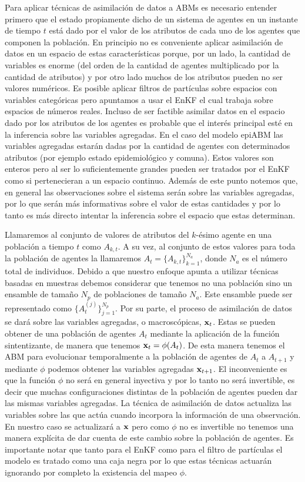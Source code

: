 Para aplicar técnicas de asimilación de datos a ABMs es necesario entender primero que el estado propiamente dicho de un sistema de agentes en un instante de tiempo $t$ está dado por el valor de los atributos de cada uno de los agentes que componen la población. En principio no es conveniente aplicar asimilación de datos en un espacio de estas características porque, por un lado, la cantidad de variables es enorme (del orden de la cantidad de agentes multiplicado por la cantidad de atributos) y por otro lado muchos de los atributos pueden no ser valores numéricos. Es posible aplicar filtros de partículas sobre espacios con variables categóricas pero apuntamos a usar el EnKF el cual trabaja sobre espacios de números reales. Incluso de ser factible asimilar datos en el espacio dado por los atributos de los agentes es probable que el interés principal esté en la inferencia sobre las variables agregadas. En el caso del modelo epiABM las variables agregadas estarán dadas por la cantidad de agentes con determinados atributos (por ejemplo estado epidemiológico y comuna). Estos valores son enteros pero al ser lo suficientemente grandes pueden ser tratados por el EnKF como si pertenecieran a un espacio continuo. Además de este punto notemos que, en general las observaciones sobre el sistema serán sobre las variables agregadas, por lo que serán más informativas sobre el valor de estas cantidades y por lo tanto es más directo intentar la inferencia sobre el espacio que estas determinan.

Llamaremos al conjunto de valores de atributos del $k$-ésimo agente en una población a tiempo $t$ como $A_{k, t}$. A su vez, al conjunto de estos valores para toda la población de agentes la llamaremos $A_t = \{ A_{k, t} \}_{k=1}^{N_a}$, donde $N_a$ es el número total de individuos. Debido a que nuestro enfoque apunta a utilizar técnicas basadas en muestras debemos considerar que tenemos no una población sino un ensamble de tamaño $N_p$ de poblaciones de tamaño $N_a$. Este ensamble puede ser representado como $\{ A_{t}^{(j)} \}_{j=1}^{N_p}$. Por su parte, el proceso de asimilación de datos se dará sobre las variables agregadas, o macroscópicas, $\mathbf{x}_t$. Estas se pueden obtener de una población de agentes $A_t$ mediante la aplicación de la función sintentizante, de manera que tenemos $\mathbf{x}_t = \phi (A_t)$. De esta manera tenemos el ABM para evolucionar temporalmente a la población de agentes de $A_t$ a $A_{t+1}$ y mediante $\phi$ podemos obtener las variables agregadas $\mathbf{x}_{t+1}$. El inconveniente es que la función $\phi$ no será en general inyectiva y por lo tanto no será invertible, es decir que muchas configuraciones distintas de la población de agentes pueden dar las mismas variables agregadas. La técnica de asimilación de datos actualiza las variables sobre las que actúa cuando incorpora la información de una observación. En nuestro caso se actualizará a $\mathbf{x}$ pero como $\phi$ no es invertible no tenemos una manera explícita de dar cuenta de este cambio sobre la población de agentes. Es importante notar que tanto para el EnKF como para el filtro de partículas el modelo es tratado como una caja negra por lo que estas técnicas actuarán ignorando por completo la existencia del mapeo $\phi$.

